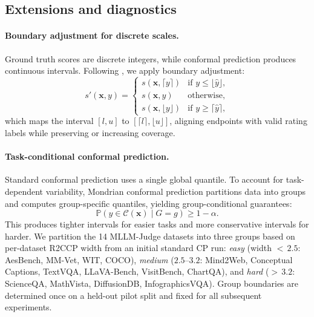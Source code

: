 \documentclass{article}
\begin{document}
\subsection{Extensions and diagnostics}

\paragraph{Boundary adjustment for discrete scales.}
Ground truth scores are discrete integers, while conformal prediction produces continuous intervals. Following \citet{sheng2025analyzing}, we apply boundary adjustment:
\begin{equation}
s'(\mathbf{x}, y) =
\begin{cases}
s(\mathbf{x}, \lceil y \rceil) & \text{if } y \leq \lfloor \hat{y} \rfloor, \\
s(\mathbf{x}, y) & \text{otherwise,} \\
s(\mathbf{x}, \lfloor y \rfloor) & \text{if } y \geq \lceil \hat{y} \rceil,
\end{cases}
\end{equation}
which maps the interval $[l, u]$ to $[\lceil l \rceil, \lfloor u \rfloor]$, aligning endpoints with valid rating labels while preserving or increasing coverage.

\paragraph{Task-conditional conformal prediction.}
Standard conformal prediction uses a single global quantile. To account for task-dependent variability, Mondrian conformal prediction partitions data into groups and computes group-specific quantiles, yielding group-conditional guarantees:
\begin{equation}
\mathbb{P}(y \in \mathcal{C}(\mathbf{x}) \mid G = g) \geq 1 - \alpha.
\end{equation}
This produces tighter intervals for easier tasks and more conservative intervals for harder. We partition the 14 MLLM-Judge datasets into three groups based on per-dataset R2CCP width from an initial standard CP run: \emph{easy} (width ${<}\,2.5$: AesBench, MM-Vet, WIT, COCO), \emph{medium} ($2.5$--$3.2$: Mind2Web, Conceptual Captions, TextVQA, LLaVA-Bench, VisitBench, ChartQA), and \emph{hard} (${>}\,3.2$: ScienceQA, MathVista, DiffusionDB, InfographicsVQA). Group boundaries are determined once on a held-out pilot split and fixed for all subsequent experiments.
\end{document}
